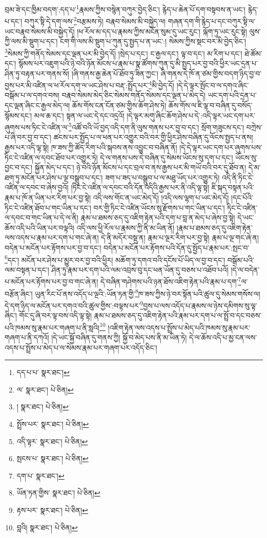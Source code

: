 བྲམ་ཟེ་དང་ཁྱིམ་བདག་:དད་པ་\footnote{དད་པ་པ་  སྣར་ཐང་། }རྣམས་ཀྱིས་བསྙེན་བཀུར་བྱེད་ཅིང་། རྙེད་པ་ཆེན་པོ་དག་བསྟབས་ན་ཡང་། རྙེད་པ་དང་། བཀུར་སྟི་དེ་དག་ལས་\footnote{ལ་  སྣར་ཐང་།  པེ་ཅིན། }བརྩམས་ཏེ། བརྣབ་སེམས་མི་བསྐྱེད་ལ། གཞན་དག་གི་རྙེད་པ་དང་བཀུར་སྟི་ལ་ཡང་བརྣབ་སེམས་མི་བསྐྱེད་དོ། །ཕ་རོལ་མ་དད་པ་རྣམས་ཀྱིས་མངོན་སུམ་དུ་ཡང་རུང་། ལྐོག་ཏུ་ཡང་རུང་སྟེ། ལུས་ཀྱི་ལས་མི་སྡུག་པ་དང་། ངག་གི་ལས་མི་སྡུག་པ་ཀུན་དུ་སྤྱད་པ་ན་ཡང་:། སེམས་ཀྱིས་སྡང་བར་མི་བྱེད་ཅིང་། \footnote{།    སྣར་ཐང་།  པེ་ཅིན། }སེམས་ཀྱི་གནོད་སེམས་དང་ལྡན་པར་མི་བྱེད་དོ། །སྲེད་པ་དང་། ང་རྒྱལ་དང་། ལྟ་བ་དང་། མ་རིག་པ་དང་། ཐེ་ཚོམ་དང་། སྙོམས་པར་འཇུག་པའི་ཉེ་བའི་ཉོན་མོངས་པ་རྣམ་པ་སྣ་ཚོགས་ཀུན་དུ་མི་སྤྱད་པར་བྱ་བའི་ཕྱིར་ཡང་དྲན་པ་ཤིན་ཏུ་བརྟན་པར་གནས་སོ། །ཞི་གནས་རྒྱ་ཆེན་པོ་ཐོབ་ཏུ་ཟིན་ཀྱང་། ཞི་གནས་དེ་ཁོ་ན་ཙམ་གྱིས་བདག་ཉིད་བྱ་བ་བྱས་པར་མི་འཛིན་ལ་ཕ་རོལ་དག་ལ་ཡང་ཤེས་པ་བརྡ་:སྤྲོད་པར་\footnote{སྤྲོས་པར་  སྣར་ཐང་།  པེ་ཅིན། }མི་བྱེད་དོ། །དེ་དེ་ལྟར་སྤོང་བ་ལ་དགའ་ཞིང་བསྒོམ་པ་ལ་དགའ་བས། བརྣབ་སེམས་མེད་ཅིང་སེམས་གནོད་སེམས་དང་ལྡན་པ་མེད་དེ། ཡང་དག་པའི་དྲན་པ་དང་ལྡན་ཞིང་ང་རྒྱལ་མེད་ལ། ཆོས་གོས་ངན་ངོན་ཙམ་གྱིས་ཆོག་ཤེས་ཏེ། ཆོས་གོས་ལ་ཇི་ལྟ་བ་བཞིན་དུ་བསོད་སྙོམས་དང་། མལ་ཆ་དང་། སྟན་ལ་ཡང་དེ་དང་འདྲའོ། །དེ་ལྟར་མགུ་ཞིང་ཆོག་ཤེས་པ་དེ་:འདི་ལྟར་ཡང་དག་པར་ཞུགས་པས་ཏིང་ངེ་འཛིན་ལ་\footnote{འདི་ལྟར་  སྣར་ཐང་།  པེ་ཅིན། }འཚོ་བའི་ཡོ་བྱད་འདི་དག་ནི་ལུས་གནས་པར་བྱ་བ་དང་། སྲོག་གཟུངས་དང་། བཀྲེས་པ་ཞི་བར་བྱ་བ་དང་། ཚངས་པར་སྤྱོད་པ་ལ་ཕན་པར་འགྱུར་བའི་བར་གྱི་ཕྱིར་ཤེས་བཞིན་དུ་ལོངས་སྤྱད་པ་ནས། རྒྱས་པར་འདི་ལྟ་སྟེ། ཁ་ཟས་ཀྱི་ཚོད་རིག་པའི་སྐབས་ནས་འབྱུང་བ་བཞིན་ནོ། །དེ་དེ་ལྟར་ཡང་དག་པར་ཞུགས་པས་ཏིང་ངེ་འཛིན་ལ་དབང་ཐོབ་པར་འགྱུར་ཏེ། དེ་ལ་གནས་པས་དེ་བཞིན་དུ་སེམས་ཡོངས་སུ་དག་པ་དང་། ཡོངས་སུ་བྱང་བ་དང་། སྐྱོན་མེད་པ་དང་། ཉེ་བའི་ཉོན་མོངས་པ་དང་བྲལ་བ་ནས་རྒྱས་པར་མི་གཡོ་བའི་བར་དུ་ཐོབ་ན། དེ་མ་ཐག་ཏུ་མངོན་པར་ཤེས་པ་ལྔ་བསྒྲུབ་པ་དང་། ཟག་པ་ཟད་པ་བསྒྲུབ་པ་ལ་མཐུ་ཡོད་པར་འགྱུར་ཏེ། འདི་ནི་ཏིང་ངེ་འཛིན་ལ་དབང་བ་ཞེས་བྱའོ། །ཏིང་ངེ་འཛིན་ལ་དབང་བའི་དོན་འདིའི་རྒྱས་པར་ནི་འདི་ལྟ་སྟེ། ཇི་སྐད་བསྟན་པའི་རྣམ་པ་ཁོ་ན་ཡིན་པར་རིག་པར་བྱ་སྟེ། འདི་ལས་གོང་ན་ཡང་མེད་དོ། །འདི་ལས་ལྷག་པ་ཡང་མེད་དོ། །དང་པོའི་ཏིང་ངེ་འཛིན་ཐོབ་པ་གང་ཡིན་པ་དང་། བར་གྱི་ཏིང་ངེ་འཛིན་ཡོངས་སུ་རྫོགས་པ་གང་ཡིན་པ་དང་། ཏིང་ངེ་འཛིན་ལ་དབང་བ་གང་ཡིན་པ་དེ་ལ་ནི། རྣམ་པ་ཐམས་ཅད་དུ་འཇིག་རྟེན་པའི་དག་པ་བླ་ན་མེད་པ་ཞེས་བྱ་སྟེ། དེ་ཡང་ཆོས་འདི་པའི་ཡིན་པར་བལྟའི། འདི་ལས་ཕྱི་རོལ་པ་རྣམས་ཀྱི་ནི་མ་ཡིན་ནོ། །རྣམ་པ་ཐམས་ཅད་དུ་འཇིག་རྟེན་ལས་འདས་པ་རྣམ་པར་དག་པ་གང་ཞེ་ན། དེ་ནི་མདོར་བསྡུ་ན། རྣམ་པ་ལྔར་རིག་པར་བྱ་སྟེ། རྣམ་པ་ལྔ་གང་ཞེ་ན། བདེན་པ་མངོན་པར་རྟོགས་པར་བྱ་བ་དང་། བདེན་པ་མངོན་པར་རྟོགས་པའི་དོན་དུ་སྤྱོད་པ་རྣམ་པར་:སྤང་བ་\footnote{སྤངས་པ་  སྣར་ཐང་།  པེ་ཅིན། }དང་། མངོན་པར་ཤེས་པ་མྱུར་བར་བྱ་བའི་ཕྱིར། མཆོག་ཏུ་དགའ་བའི་དངོས་པོ་ཡིད་ལ་བྱ་བ་དང་། བསྒོམ་པའི་ལམ་བསྟན་པ་དང་། ཤིན་ཏུ་རྣམ་པར་དག་པའི་ལམ་འབྲས་བུ་དང་ཕན་ཡོན་དུ་བཅས་པ་འཐོབ་པའོ། །དེ་ལ་བདེན་པ་མངོན་པར་རྟོགས་པར་བྱ་བ་གང་ཞེ་ན། དེ་བཞིན་གཤེགས་པའི་ཉན་ཐོས་འཇིག་རྟེན་པའི་རྣམ་པ་དག་\footnote{དག་པ་  སྣར་ཐང་། }ལ་བརྩོན་ཞིང་། ཡུན་རིང་པོ་ནས་འདོད་པ་ལྔའི་:ཡོན་ཏན་གྱི་\footnote{ཡོན་ཏན་གྱིས་  སྣར་ཐང་།  པེ་ཅིན། }ཁ་ཟས་ཀྱིས་ཉེ་བར་སྟོན་པའི་ཚུལ་དུ་སེམས་གསོས་ལ། དེ་དག་ཉིད་ལ་མངོན་པར་དགའ་བའི་ཚུལ་གྱིས་:བལྟས་པར་\footnote{རྟས་པར་  སྣར་ཐང་།  པེ་ཅིན། }བྱས་པ་ལས་འདོད་པ་རྣམས་ལ་ཉེས་དམིགས་སུ་ལྟ་ཞིང་། གོང་དུ་ཞི་བར་ལྟ་བས་འདི་ལྟ་སྟེ། རྣམ་པ་ཐམས་ཅད་དུ་འཇིག་རྟེན་པའི་རྣམ་པར་དག་པ་ལ་སྤྲོ་བ་དང་བཅས་པའི་ཁམས་སུ་རྣམ་པར་གཞག་པ་ནི་སླའི།\footnote{བླའི།  སྣར་ཐང་།  པེ་ཅིན། } །འཇིག་རྟེན་ལས་འདས་པ་སྤྲོས་པ་མེད་པའི་ཁམས་སུ་རྣམ་པར་གཞག་པ་ནི་དཀའོ། །དེ་ཡང་སྐྱོ་བཞིན་དུ་གནས་ཀྱི། སྐྱོ་བ་མེད་པས་ནི་མ་ཡིན་ཏེ། དེ་ལ་ཆོས་འདི་པ་མྱ་ངན་ལས་འདས་པ་སྤྲོས་པ་མེད་པ་ལ་སེམས་རྣམ་པར་གཞག་པར་འདོད་ཅིང་། 